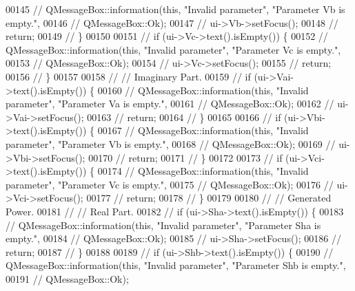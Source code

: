 \begin{DoxyCode}
00145 \textcolor{comment}{//    QMessageBox::information(this, "Invalid parameter", "Parameter Vb is empty.",}
00146 \textcolor{comment}{//                             QMessageBox::Ok);}
00147 \textcolor{comment}{//    ui->Vb->setFocus();}
00148 \textcolor{comment}{//    return;}
00149 \textcolor{comment}{//  \}}
00150 
00151 \textcolor{comment}{//  if (ui->Vc->text().isEmpty()) \{}
00152 \textcolor{comment}{//    QMessageBox::information(this, "Invalid parameter", "Parameter Vc is empty.",}
00153 \textcolor{comment}{//                             QMessageBox::Ok);}
00154 \textcolor{comment}{//    ui->Vc->setFocus();}
00155 \textcolor{comment}{//    return;}
00156 \textcolor{comment}{//  \}}
00157 
00158 \textcolor{comment}{//  // Imaginary Part.}
00159 \textcolor{comment}{//  if (ui->Vai->text().isEmpty()) \{}
00160 \textcolor{comment}{//    QMessageBox::information(this, "Invalid parameter", "Parameter Va is empty.",}
00161 \textcolor{comment}{//                             QMessageBox::Ok);}
00162 \textcolor{comment}{//    ui->Vai->setFocus();}
00163 \textcolor{comment}{//    return;}
00164 \textcolor{comment}{//  \}}
00165 
00166 \textcolor{comment}{//  if (ui->Vbi->text().isEmpty()) \{}
00167 \textcolor{comment}{//    QMessageBox::information(this, "Invalid parameter", "Parameter Vb is empty.",}
00168 \textcolor{comment}{//                             QMessageBox::Ok);}
00169 \textcolor{comment}{//    ui->Vbi->setFocus();}
00170 \textcolor{comment}{//    return;}
00171 \textcolor{comment}{//  \}}
00172 
00173 \textcolor{comment}{//  if (ui->Vci->text().isEmpty()) \{}
00174 \textcolor{comment}{//    QMessageBox::information(this, "Invalid parameter", "Parameter Vc is empty.",}
00175 \textcolor{comment}{//                             QMessageBox::Ok);}
00176 \textcolor{comment}{//    ui->Vci->setFocus();}
00177 \textcolor{comment}{//    return;}
00178 \textcolor{comment}{//  \}}
00179 
00180 \textcolor{comment}{//  // Generated Power.}
00181 \textcolor{comment}{//  // Real Part.}
00182 \textcolor{comment}{//  if (ui->Sha->text().isEmpty()) \{}
00183 \textcolor{comment}{//    QMessageBox::information(this, "Invalid parameter", "Parameter Sha is empty.",}
00184 \textcolor{comment}{//                             QMessageBox::Ok);}
00185 \textcolor{comment}{//    ui->Sha->setFocus();}
00186 \textcolor{comment}{//    return;}
00187 \textcolor{comment}{//  \}}
00188 
00189 \textcolor{comment}{//  if (ui->Shb->text().isEmpty()) \{}
00190 \textcolor{comment}{//    QMessageBox::information(this, "Invalid parameter", "Parameter Shb is empty.",}
00191 \textcolor{comment}{//                             QMessageBox::Ok);}

\end{DoxyCode}
